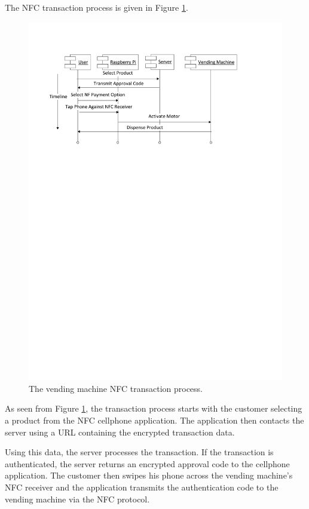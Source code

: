 The NFC transaction process is given in Figure \ref{fig:vm_nfc_interaction}.

\begin{figure}
 \centering 
 \includegraphics[clip=true, trim = 0 540 0 70, scale=0.7]{nfc_transaction_processflow}
 \caption{The vending machine NFC transaction process.}
 \label{fig:vm_nfc_interaction}
\end{figure}

As seen from Figure \ref{fig:vm_nfc_interaction}, the transaction process starts with the
customer selecting a product from the NFC cellphone application. The application then contacts
the server using a URL containing the encrypted transaction data. 

Using this data, the server processes the transaction. If the transaction is
authenticated, the server returns an encrypted approval code to the cellphone
application. The customer then swipes his phone across the vending machine's NFC
receiver and the application transmits the authentication code to the vending machine
via the NFC protocol. 

